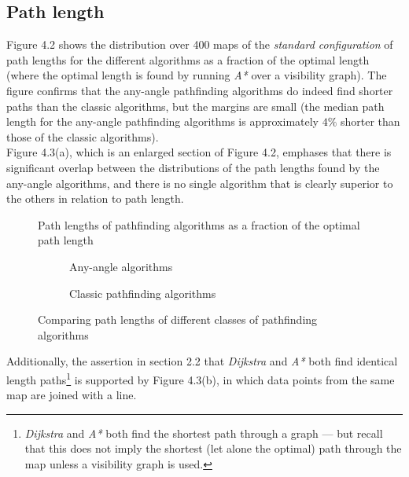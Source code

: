 \documentclass[12pt,notitlepage]{report}
\begin{document}
\subsection{Path length}
Figure 4.2 shows the distribution over 400 maps of the {\em standard configuration} of path lengths for the different algorithms  as a fraction of the optimal length (where the optimal length is found by running {\em A*} over a visibility graph).  The figure confirms that the any-angle pathfinding algorithms do indeed find shorter paths than the classic algorithms, but the margins are small (the median path length for the any-angle pathfinding algorithms is approximately $4\%$ shorter than those of the classic algorithms).\\

\noindent
Figure 4.3(a), which is an enlarged section of Figure 4.2, emphases that there is significant overlap between the distributions of the path lengths found by the any-angle algorithms, and there is no single algorithm that is clearly superior to the others in relation to path length.\\

\begin{figure}
\centering

\caption[Path lengths computed by pathfinding algorithms]{Path lengths of pathfinding algorithms as a fraction of the optimal path length}
\end{figure}

\begin{figure}
\centering
  \begin{subfigure}{0.49\textwidth}
  \centering
  
  \caption{Any-angle algorithms}
  \end{subfigure}
  \begin{subfigure}{0.49\textwidth}
  \centering
  
  \caption{Classic pathfinding algorithms}
  \end{subfigure}
\caption{Comparing path lengths of different classes of pathfinding algorithms}
\end{figure}

\noindent
Additionally, the assertion in section 2.2 that {\em Dijkstra} and {\em A*} both find identical length paths\footnote{{\em Dijkstra} and {\em A*} both find the shortest path through a graph --- but recall that this does not imply the shortest (let alone the optimal) path through the map unless a visibility graph is used.} is supported by Figure 4.3(b), in which data points from the same map are joined with a line.
\end{document}
